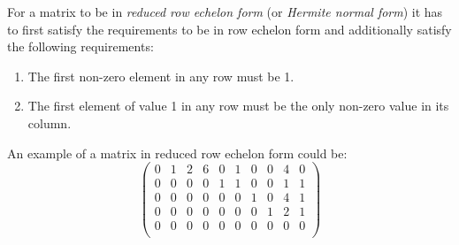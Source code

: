 \documentclass[12pt]{article}
\begin{document}
For a matrix to be in \emph{reduced row echelon form} (or \emph{Hermite normal form}) it has to first satisfy the requirements to be in row echelon form and additionally satisfy the following requirements:

\begin{enumerate}
\item The first non-zero element in any row must be 1.
\item The first element of value 1 in any row must be the only non-zero value in its column.
\end{enumerate}
An example of a matrix in reduced row echelon form could be:
\begin{displaymath}
\left( \begin{array}{cccccccccc}
0 & 1 & 2 & 6 & 0 & 1 & 0 & 0 & 4 & 0\\
0 & 0 & 0 & 0 & 1 & 1 & 0 & 0 & 1 & 1\\
0 & 0 & 0 & 0 & 0 & 0 & 1 & 0 & 4 & 1\\
0 & 0 & 0 & 0 & 0 & 0 & 0 & 1 & 2 & 1\\
0 & 0 & 0 & 0 & 0 & 0 & 0 & 0 & 0 & 0\\
\end{array}
\right)
\end{displaymath}
\end{document}
